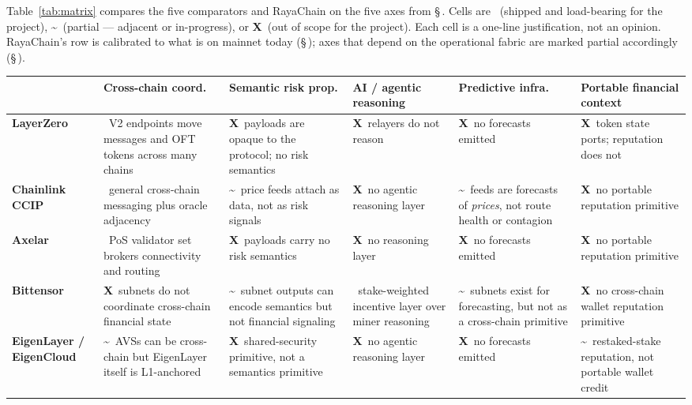 \documentclass[11pt,a4paper]{article}
\newcommand{\yes}{\textcolor{green!55!black}{\textbf{\checkmark}}}
\newcommand{\no}{\textcolor{red!70!black}{\textbf{\textsf{X}}}}
\newcommand{\partialmark}{\textcolor{orange!85!black}{\textbf{\textasciitilde}}}
\begin{document}
Table~\ref{tab:matrix} compares the five comparators and RayaChain on
the five axes from \S\,. Cells are \yes\ (shipped and
load-bearing for the project), \partialmark\ (partial --- adjacent or
in-progress), or \no\ (out of scope for the project). Each cell is a
one-line justification, not an opinion. RayaChain's row is calibrated
to what is on mainnet today (\S\,); axes that depend on
the operational fabric are marked partial accordingly
(\S\,).

\renewcommand{\arraystretch}{1.25}
\begin{table}[ht]
\centering
\small
{}
\begin{tabularx}{\textwidth}{@{}l Y Y Y Y Y@{}}
\toprule
 & \textbf{Cross-chain coord.} & \textbf{Semantic risk prop.}
 & \textbf{AI / agentic reasoning} & \textbf{Predictive infra.}
 & \textbf{Portable financial context} \\
\midrule
\textbf{LayerZero}
 & \yes\ V2 endpoints move messages and OFT tokens across many chains
 & \no\ payloads are opaque to the protocol; no risk semantics
 & \no\ relayers do not reason
 & \no\ no forecasts emitted
 & \no\ token state ports; reputation does not \\
\textbf{Chainlink CCIP}
 & \yes\ general cross-chain messaging plus oracle adjacency
 & \partialmark\ price feeds attach as data, not as risk signals
 & \no\ no agentic reasoning layer
 & \partialmark\ feeds are forecasts of \emph{prices}, not route health or contagion
 & \no\ no portable reputation primitive \\
\textbf{Axelar}
 & \yes\ PoS validator set brokers connectivity and routing
 & \no\ payloads carry no risk semantics
 & \no\ no reasoning layer
 & \no\ no forecasts emitted
 & \no\ no portable reputation primitive \\
\textbf{Bittensor}
 & \no\ subnets do not coordinate cross-chain financial state
 & \partialmark\ subnet outputs can encode semantics but not financial signaling
 & \yes\ stake-weighted incentive layer over miner reasoning
 & \partialmark\ subnets exist for forecasting, but not as a cross-chain primitive
 & \no\ no cross-chain wallet reputation primitive \\
\textbf{EigenLayer / EigenCloud}
 & \partialmark\ AVSs can be cross-chain but EigenLayer itself is L1-anchored
 & \no\ shared-security primitive, not a semantics primitive
 & \no\ no agentic reasoning layer
 & \no\ no forecasts emitted
 & \partialmark\ restaked-stake reputation, not portable wallet credit \\

\end{tabularx}
\end{table}
\end{document}
